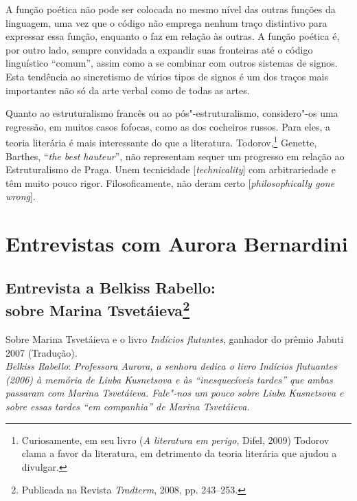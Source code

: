 A função poética não pode ser colocada no mesmo nível das outras funções
da linguagem, uma vez que o código não emprega nenhum traço distintivo
para expressar essa função, enquanto o faz em relação às outras. A
função poética é, por outro lado, sempre convidada a expandir suas
fronteiras até o código linguístico ``comum'', assim como a se combinar
com outros sistemas de signos.
Esta tendência ao sincretismo de vários tipos de signos é um
dos traços mais importantes não só da arte verbal como de todas as artes.

Quanto ao estruturalismo francês ou ao pós"-estruturalismo, considero"-os
uma regressão, em muitos casos fofocas, como as dos cocheiros russos.
Para eles, a teoria literária é mais interessante do que a literatura.
Todorov,\footnote{Curiosamente, em seu livro (\emph{A literatura
em perigo}, Difel, 2009) Todorov clama a favor da literatura, em detrimento da
teoria literária que ajudou a divulgar.} Genette, Barthes, ``\emph{the best hauteur}'', não representam
sequer um progresso em relação ao Estruturalismo de Praga. Unem
tecnicidade [\emph{technicality}] com arbitrariedade e têm muito pouco
rigor. Filosoficamente, não deram certo [\emph{philosophically gone
wrong}].

\part{Entrevistas com Aurora Bernardini}

\chapter{Entrevista a Belkiss Rabello:\\
sobre Marina Tsvetáieva\footnote{Publicada na Revista
  \emph{Tradterm}, 2008, pp. 243--253.}}
\label{rabello}

Sobre Marina Tsvetáieva e o livro \emph{Indícios flutuntes}, ganhador do
prêmio Jabuti 2007 (Tradução). \\

\noindent
\emph{Belkiss Rabello}: \emph{Professora Aurora, a senhora dedica o
livro \emph{Indícios flutuantes} (2006) à memória de Liuba Kusnetsova e
às ``inesquecíveis tardes'' que ambas passaram com Marina Tsvetáieva.
Fale"-nos um pouco sobre Liuba Kusnetsova e sobre essas tardes ``em
companhia'' de Marina Tsvetáieva.}

